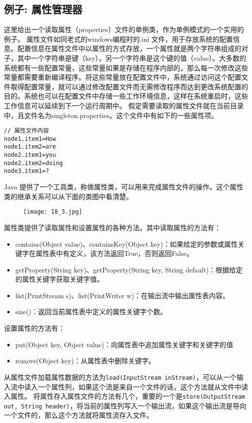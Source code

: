 \documentclass[../main.tex]{subfiles}
\begin{document}
\subsection{例子: 属性管理器}
这里给出一个读取属性（properties）文件的单例类，作为单例模式的一个实用的例子。
属性文件如同老式的windows编程时的.ini 文件，用于存放系统的配置信息。配置信息在属性文件中以属性的方式存放，一个属性就是两个字符串组成的对子，其中一个字符串是键（key），另一个字符串是这个键的值（value）。大多数的系统都有一些配置常量，这些常量如果是存储在程序内部的，那么每一次修改这些常量都需要重新编译程序。将这些常量放在配置文件中，系统通过访问这个配置文件取得配置常量，就可以通过修改配置文件而无需修改程序而达到更改系统配置的目的。系统也可以在配置文件中存储一些工作环境信息，这样在系统重启时，这些工作信息可以延续到下一个运行周期中。
假定需要读取的属性文件就在当前目录中，且文件名为singleton.properties。这个文件中有如下的一些属性项。
%
\begin{lstlisting}
// 属性文件内容
node1.item1=How
node1.item2=are
node2.item1=you
node2.item2=doing
node3.item1=?
\end{lstlisting}
%
Java 提供了一个工具类，称做属性类，可以用来完成属性文件的操作。这个属性类的继承关系可以从下面的类图中看清楚。
\begin{figure}[H]
  \texttt{[image: 18\_3.jpg]}
\end{figure}
%
属性类提供了读取属性和设置属性的各种方法。其中读取属性的方法有：
\begin{itemize}
  \item contains(Object value)、containsKey(Object key)：如果给定的参数或属性关键字在属性表中有定义，该方法返回True，否则返回False。
  \item getProperty(String key)、getProperty(String key, String default)：根据给定的属性关键字获取关键字值。
  \item list(PrintStream s)、list(PrintWriter w)：在输出流中输出属性表内容。
  \item size()：返回当前属性表中定义的属性关键字个数。
\end{itemize}
%
设置属性的方法有：
\begin{itemize}
  \item put(Object key, Object value)：向属性表中追加属性关键字和关键字的值
  \item remove(Object key)：从属性表中删除关键字。
\end{itemize}
%
从属性文件加载属性数据的方法为\texttt{load(InputStream inStream)}，可以从一个输入流中读入一个属性列，如果这个流是来自一个文件的话，这个方法就从文件中读入属性。
将属性存入属性文件的方法有几个，重要的一个是\texttt{store(OutputStream out, String header)}，将当前的属性列写入一个输出流，如果这个输出流是导向一个文件的，那么这个方法就将属性流存入文件。
\end{document}
